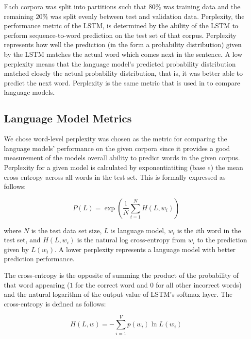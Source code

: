 \documentclass{article}
\begin{document}

Each corpora was split into partitions such that $80\%$ was training data
and the remaining $20\%$ was split evenly between test and validation
data. Perplexity, the performance metric of the LSTM, is determined by the
ability of the LSTM to perform sequence-to-word prediction on the test
set of that corpus. Perplexity represents how well the prediction (in the
form a probability distribution) given by the LSTM matches the actual
word which comes next in the sentence. A low perplexity means that the
language model's predicted probability distribution matched closely the
actual probability distribution, that is, it was better able to predict
the next word. Perplexity is the same metric that is used in
\citet{LSTMArticle} to compare language models.

\subsection{Language Model Metrics}

We chose word-level perplexity was chosen as the metric for comparing the
language models' performance on the given corpora since it provides
a good measurement of the models overall ability to predict words
in the given corpus. Perplexity for a given model is calculated
by exponentiatiting (base $e$) the mean
cross-entropy across all words in the test set. This is formally
expressed as follows:

\begin{equation}
\label{perplexity}
    P(L) = \exp\left(\frac{1}{N}\sum^{N}_{i=1} H(L,w_i)\right)
\end{equation}

where $N$ is the test data set size, $L$ is language model, $w_i$
is the $i$th word in the test set, and $H(L, w_i)$ is the natural log
cross-entropy from $w_i$ to the prediction given by $L(w_i)$. A lower perplexity represents a language model with better prediction
performance.

The cross-entropy is the opposite of summing the
product of the probability of that word appearing ($1$ for the
correct word and $0$ for all other incorrect words) and the
natural logarithm of the output value of LSTM's softmax layer.
The cross-entropy is defined as follows:

\begin{equation}
\label{cross-entropy}
    H(L,w) = - \sum_{i=1}^V p(w_i) \ln L(w_i)
\end{equation}
\end{document}
